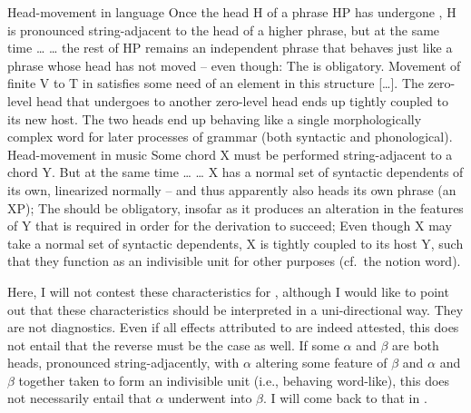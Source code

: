 \documentclass[output=paper]{langsci/langscibook}
\begin{document}
\ea\label{ex:26.10}Head-movement in language \parencite[40]{KatzPes2011}
    \ea Once the head H of a phrase HP has undergone , H is
    pronounced string-adjacent to the head of a higher phrase, but at the same
    time \dots{}
    \ex \dots{} the rest of HP remains an independent phrase that behaves just
    like a phrase whose head has not moved -- even though:
    \ex The  is obligatory. Movement of finite V to T in 
    satisfies some need of an element in this structure [\dots{}].
    \ex The zero-level head that undergoes  to another zero-level
    head ends up tightly coupled to its new host. The two heads end up behaving
    like a single morphologically complex word for later processes of grammar
    (both syntactic and phonological).
    \z
\ex\label{ex:26.11}Head-movement in music \parencite[41]{KatzPes2011}
    \ea Some chord X must be performed string-adjacent to a chord Y. But at the
    same time \dots{}
    \ex \dots{} X has a normal set of syntactic dependents of its own,
    linearized normally -- and thus apparently also heads its own phrase (an
    XP);
    \ex The  should be obligatory, insofar as it produces an alteration
    in the features of Y that is required in order for the derivation to
    succeed;
    \ex Even though X may take a normal set of syntactic dependents, X is
    tightly coupled to its host Y, such that they function as an indivisible
    unit for other purposes (cf.\ the notion word).
    \z
\z

Here, I will not contest these characteristics for , although I would
like to point out that these characteristics should be interpreted in a
uni-di\-rec\-tion\-al way. They are not diagnostics. Even if all effects attributed
to  are indeed attested, this does not entail that the reverse
must be the case as well. If some ${\alpha}$ and ${\beta}$ are both heads,
pronounced string-adjacently, with ${\alpha}$ altering some feature of
${\beta}$ and ${\alpha}$ and ${\beta}$ together taken to form an indivisible
unit (i.e., behaving word-like), this does not necessarily entail that
${\alpha}$ underwent  into ${\beta}$. I will come back to that in
.
\end{document}
